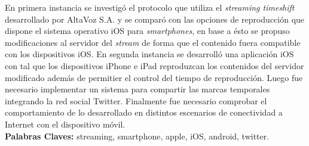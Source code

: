  

En primera instancia se investigó el protocolo que utiliza el \textit{streaming timeshift} desarrollado por AltaVoz S.A. y se comparó con las opciones de reproducción que dispone el sistema operativo iOS para \textit{smartphones}, en base a ésto se propuso modificaciones al servidor del \textit{stream} de forma que el contenido fuera compatible con los dispositivos iOS. En segunda instancia se desarrolló una aplicación iOS con tal que los dispositivos iPhone e iPad reproduzcan los contenidos del servidor modificado además de permitier el control del tiempo de reproducción. Luego fue necesario implementar un sistema para compartir las marcas temporales integrando la red social Twitter. Finalmente fue necesario comprobar el comportamiento de lo desarrollado en distintos escenarios de conectividad a Internet con el dispositivo móvil.\\


\textbf{Palabras Claves:} streaming, smartphone, apple, iOS, android, twitter.

